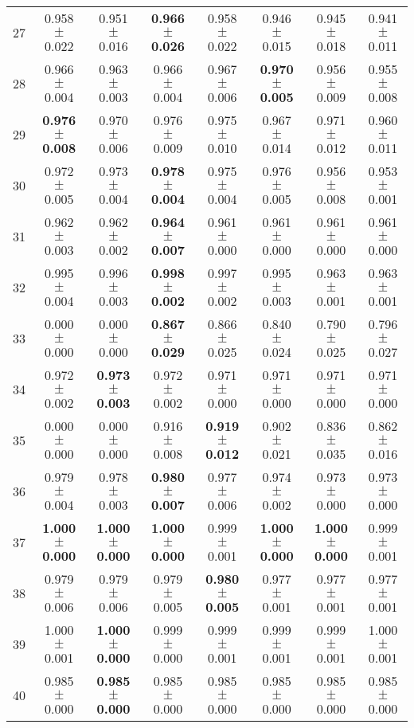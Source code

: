 \begin{table}[!ht]
{\begin{tabular}{r c c c c c c c}
27 & 0.958 $\pm$ 0.022 & 0.951 $\pm$ 0.016 & \textbf{0.966 $\pm$ 0.026} & 0.958 $\pm$ 0.022 & 0.946 $\pm$ 0.015 & 0.945 $\pm$ 0.018 & 0.941 $\pm$ 0.011 \\
28 & 0.966 $\pm$ 0.004 & 0.963 $\pm$ 0.003 & 0.966 $\pm$ 0.004 & 0.967 $\pm$ 0.006 & \textbf{0.970 $\pm$ 0.005} & 0.956 $\pm$ 0.009 & 0.955 $\pm$ 0.008 \\
29 & \textbf{0.976 $\pm$ 0.008} & 0.970 $\pm$ 0.006 & 0.976 $\pm$ 0.009 & 0.975 $\pm$ 0.010 & 0.967 $\pm$ 0.014 & 0.971 $\pm$ 0.012 & 0.960 $\pm$ 0.011 \\
30 & 0.972 $\pm$ 0.005 & 0.973 $\pm$ 0.004 & \textbf{0.978 $\pm$ 0.004} & 0.975 $\pm$ 0.004 & 0.976 $\pm$ 0.005 & 0.956 $\pm$ 0.008 & 0.953 $\pm$ 0.001 \\
31 & 0.962 $\pm$ 0.003 & 0.962 $\pm$ 0.002 & \textbf{0.964 $\pm$ 0.007} & 0.961 $\pm$ 0.000 & 0.961 $\pm$ 0.000 & 0.961 $\pm$ 0.000 & 0.961 $\pm$ 0.000 \\
32 & 0.995 $\pm$ 0.004 & 0.996 $\pm$ 0.003 & \textbf{0.998 $\pm$ 0.002} & 0.997 $\pm$ 0.002 & 0.995 $\pm$ 0.003 & 0.963 $\pm$ 0.001 & 0.963 $\pm$ 0.001 \\
33 & 0.000 $\pm$ 0.000 & 0.000 $\pm$ 0.000 & \textbf{0.867 $\pm$ 0.029} & 0.866 $\pm$ 0.025 & 0.840 $\pm$ 0.024 & 0.790 $\pm$ 0.025 & 0.796 $\pm$ 0.027 \\
34 & 0.972 $\pm$ 0.002 & \textbf{0.973 $\pm$ 0.003} & 0.972 $\pm$ 0.002 & 0.971 $\pm$ 0.000 & 0.971 $\pm$ 0.000 & 0.971 $\pm$ 0.000 & 0.971 $\pm$ 0.000 \\
35 & 0.000 $\pm$ 0.000 & 0.000 $\pm$ 0.000 & 0.916 $\pm$ 0.008 & \textbf{0.919 $\pm$ 0.012} & 0.902 $\pm$ 0.021 & 0.836 $\pm$ 0.035 & 0.862 $\pm$ 0.016 \\
36 & 0.979 $\pm$ 0.004 & 0.978 $\pm$ 0.003 & \textbf{0.980 $\pm$ 0.007} & 0.977 $\pm$ 0.006 & 0.974 $\pm$ 0.002 & 0.973 $\pm$ 0.000 & 0.973 $\pm$ 0.000 \\
37 & \textbf{1.000 $\pm$ 0.000} & \textbf{1.000 $\pm$ 0.000} & \textbf{1.000 $\pm$ 0.000} & 0.999 $\pm$ 0.001 & \textbf{1.000 $\pm$ 0.000} & \textbf{1.000 $\pm$ 0.000} & 0.999 $\pm$ 0.001 \\
38 & 0.979 $\pm$ 0.006 & 0.979 $\pm$ 0.006 & 0.979 $\pm$ 0.005 & \textbf{0.980 $\pm$ 0.005} & 0.977 $\pm$ 0.001 & 0.977 $\pm$ 0.001 & 0.977 $\pm$ 0.001 \\
39 & 1.000 $\pm$ 0.001 & \textbf{1.000 $\pm$ 0.000} & 0.999 $\pm$ 0.000 & 0.999 $\pm$ 0.001 & 0.999 $\pm$ 0.001 & 0.999 $\pm$ 0.001 & 1.000 $\pm$ 0.001 \\
40 & 0.985 $\pm$ 0.000 & \textbf{0.985 $\pm$ 0.000} & 0.985 $\pm$ 0.000 & 0.985 $\pm$ 0.000 & 0.985 $\pm$ 0.000 & 0.985 $\pm$ 0.000 & 0.985 $\pm$ 0.000 \\
\end{tabular}}
\end{table}
